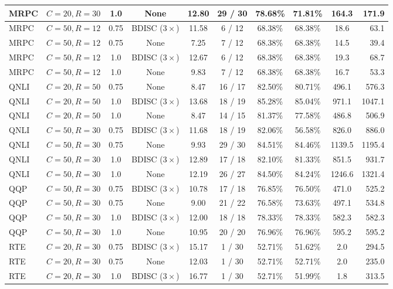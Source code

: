 \documentclass[10pt,a4paper]{article}
\begin{document}
\begin{table}[H]
\begin{tabular*}{\textwidth}{@{\extracolsep{\fill}}lccccccccr@{}}
MRPC & $C=20, R=30$ & 1.0 & None & 12.80 & 29 / 30 & 78.68\% & 71.81\% & 164.3 & 171.9 \\
\midrule
MRPC & $C=50, R=12$ & 0.75 & BDISC ($3\times$) & 11.58 & 6 / 12 & 68.38\% & 68.38\% & 18.6 & 63.1 \\
MRPC & $C=50, R=12$ & 0.75 & None & 7.25 & 7 / 12 & 68.38\% & 68.38\% & 14.5 & 39.4 \\
MRPC & $C=50, R=12$ & 1.0 & BDISC ($3\times$) & 12.67 & 6 / 12 & 68.38\% & 68.38\% & 19.3 & 68.7 \\
MRPC & $C=50, R=12$ & 1.0 & None & 9.83 & 7 / 12 & 68.38\% & 68.38\% & 16.7 & 53.3 \\
\midrule
QNLI & $C=20, R=50$ & 0.75 & None & 8.47 & 16 / 17 & 82.50\% & 80.71\% & 496.1 & 576.3 \\
QNLI & $C=20, R=50$ & 1.0 & BDISC ($3\times$) & 13.68 & 18 / 19 & 85.28\% & 85.04\% & 971.1 & 1047.1 \\
QNLI & $C=20, R=50$ & 1.0 & None & 8.47 & 14 / 15 & 81.37\% & 77.58\% & 486.8 & 506.9 \\
\midrule
QNLI & $C=50, R=30$ & 0.75 & BDISC ($3\times$) & 11.68 & 18 / 19 & 82.06\% & 56.58\% & 826.0 & 886.0 \\
QNLI & $C=50, R=30$ & 0.75 & None & 9.93 & 29 / 30 & 84.51\% & 84.46\% & 1139.5 & 1195.4 \\
QNLI & $C=50, R=30$ & 1.0 & BDISC ($3\times$) & 12.89 & 17 / 18 & 82.10\% & 81.33\% & 851.5 & 931.7 \\
QNLI & $C=50, R=30$ & 1.0 & None & 12.19 & 26 / 27 & 84.50\% & 84.24\% & 1246.6 & 1321.4 \\
\midrule
QQP & $C=50, R=30$ & 0.75 & BDISC ($3\times$) & 10.78 & 17 / 18 & 76.85\% & 76.50\% & 471.0 & 525.2 \\
QQP & $C=50, R=30$ & 0.75 & None & 9.00 & 21 / 22 & 76.58\% & 73.63\% & 497.1 & 534.8 \\
QQP & $C=50, R=30$ & 1.0 & BDISC ($3\times$) & 12.00 & 18 / 18 & 78.33\% & 78.33\% & 582.3 & 582.3 \\
QQP & $C=50, R=30$ & 1.0 & None & 10.95 & 20 / 20 & 76.96\% & 76.96\% & 595.2 & 595.2 \\
\midrule
RTE & $C=20, R=30$ & 0.75 & BDISC ($3\times$) & 15.17 & 1 / 30 & 52.71\% & 51.62\% & 2.0 & 294.5 \\
RTE & $C=20, R=30$ & 0.75 & None & 12.03 & 1 / 30 & 52.71\% & 52.71\% & 2.0 & 235.0 \\
RTE & $C=20, R=30$ & 1.0 & BDISC ($3\times$) & 16.77 & 1 / 30 & 52.71\% & 51.99\% & 1.8 & 313.5 \\

\end{tabular*}
\end{table}
\end{document}
